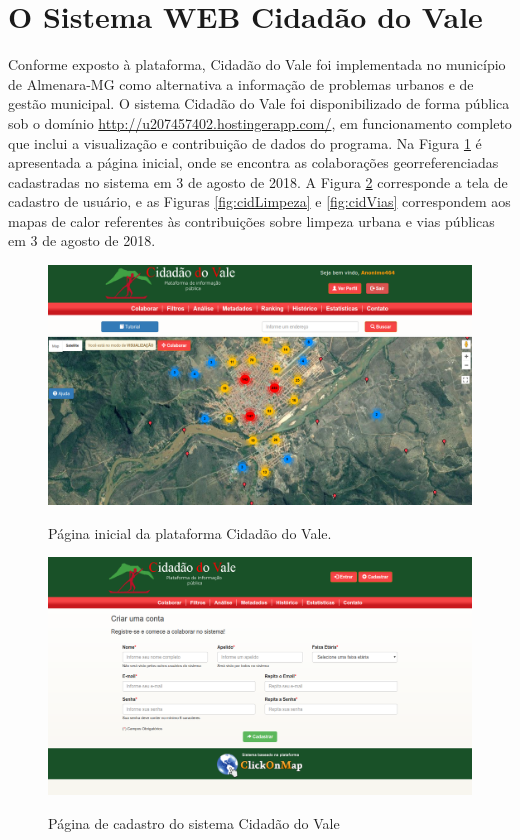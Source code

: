 \section{O Sistema WEB Cidadão do Vale}
    Conforme exposto à plataforma, Cidadão do Vale foi implementada no município de Almenara-MG como alternativa a informação de problemas urbanos e de gestão municipal. O sistema Cidadão do Vale foi disponibilizado de forma pública sob o domínio \url{http://u207457402.hostingerapp.com/}, em funcionamento completo que inclui a visualização e contribuição de dados do programa. Na Figura \ref{fig:cidInicio} é apresentada a página inicial, onde se encontra as colaborações georreferenciadas cadastradas no sistema em 3 de agosto de 2018. A Figura \ref{fig:cidCadastro} corresponde a tela de cadastro de usuário, e as Figuras \ref{fig:cidLimpeza} e \ref{fig:cidVias} correspondem aos mapas de calor referentes às contribuições sobre limpeza urbana e vias públicas em 3 de agosto de 2018.

    \begin{figure}[H]
    	\centering
    	\caption{Página inicial da plataforma Cidadão do Vale.}
    	\includegraphics[width=0.6\linewidth]{Imagens/01}
    	\label{fig:cidInicio}
    \end{figure}
    
    \begin{figure}[H]
    	\centering
    	\caption{Página de cadastro do sistema Cidadão do Vale}	
    	\includegraphics[width=0.6\linewidth]{Imagens/02}
    	\label{fig:cidCadastro}
    \end{figure}
    
